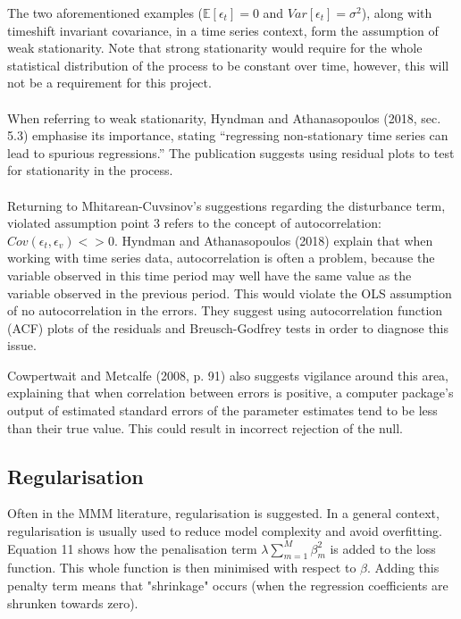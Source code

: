 \documentclass[11pt, a4paper]{article}
\begin{document}
The two aforementioned examples ($\mathbb{E}[\epsilon_{t}] = 0$ and $Var[\epsilon_{t}] = \sigma^2$), along with timeshift invariant covariance, in a time series context, form the assumption of weak stationarity. Note that strong stationarity would require for the whole statistical distribution of the process to be constant over time, however, this will not be a requirement for this project.\\\\ 
When referring to weak stationarity, Hyndman and Athanasopoulos (2018, sec. 5.3) emphasise its importance, stating “regressing non-stationary time series can lead to spurious regressions.” The publication suggests using residual plots to test for stationarity in the process.\\\\
Returning to Mhitarean-Cuvsinov's suggestions regarding the disturbance term, violated assumption point 3 refers to the concept of autocorrelation: $Cov (\epsilon_{t}, \epsilon_{v}) <> 0$. Hyndman and Athanasopoulos (2018) explain that when working with time series data, autocorrelation is often a problem, because the variable observed in this time period may well have the same value as the variable observed in the previous period. This would violate the OLS assumption of no autocorrelation in the errors. They suggest using autocorrelation function (ACF) plots of the residuals and Breusch-Godfrey tests in order to diagnose this issue. 

Cowpertwait and Metcalfe (2008, p. 91) also suggests vigilance around this area, explaining that when correlation between errors is positive, a computer package’s output of estimated standard errors of the parameter estimates tend to be less than their true value. This could result in incorrect rejection of the null. 

\subsection{Regularisation}

Often in the MMM literature, regularisation is suggested. In a general context, regularisation is usually used to reduce model complexity and avoid overfitting. Equation 11 shows how the penalisation term $\lambda\sum_{m=1}^{M}\beta_{m}^2$ is added to the loss function. This whole function is then minimised with respect to $\beta$. Adding this penalty term means that "shrinkage" occurs (when the regression coefficients are shrunken towards zero). 
\end{document}
